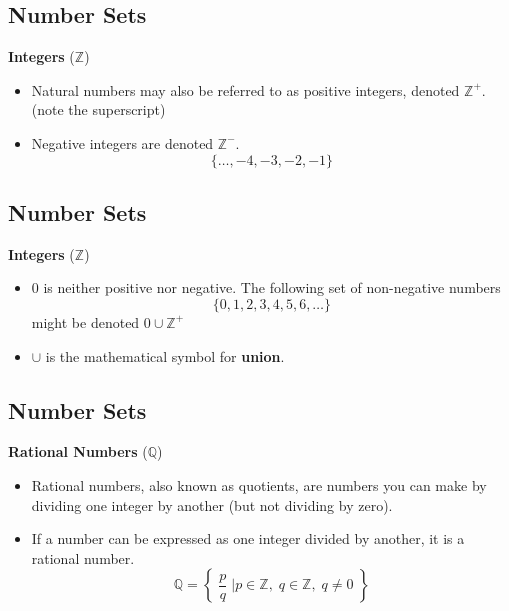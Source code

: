 \documentclass[11pt,a4paper,titlepage,oneside,openany]{article}
\numberwithin{equation}{section}
\numberwithin{algorithm}{section}
\numberwithin{figure}{section}
\numberwithin{table}{section}
\begin{document}
{%


\subsection{Number Sets}

\textbf{Integers} ($\mathbb{Z}$)
\begin{itemize}
\item Natural numbers may also be referred to as positive integers, denoted $\mathbb{Z}^{+}$. \\(note the superscript)
\item Negative integers are denoted $\mathbb{Z}^{-}$.
\[\{\ldots,-4,-3,-2,-1\}\]
\end{itemize}



\subsection{Number Sets}

\textbf{Integers} ($\mathbb{Z}$)
\begin{itemize}
\item 0 is neither positive nor negative. The following set of non-negative numbers \[\{0,1,2,3,4,5,6,\ldots\} \] might be denoted $0 \cup \mathbb{Z}^{+}$
\item $\cup$ is the mathematical symbol for \textbf{union}.
\end{itemize}



\subsection{Number Sets}

\textbf{Rational Numbers} ($\mathbb{Q}$)
\begin{itemize}
\item Rational numbers, also known as quotients, are numbers you can make by dividing one integer by another (but not dividing by zero). 
\item If a number can be expressed as one integer divided by another, it is a rational number.
\[ \mathbb{Q} = \left\{\; \frac{p}{q} \;\bigg| p \in \mathbb{Z},\; q \in \mathbb{Z},\; q \neq 0  \;   \right\}   \]
\end{itemize}

}
\end{document}
